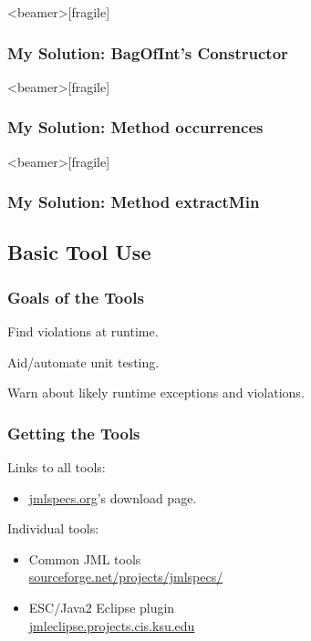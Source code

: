 \begin{frame}<beamer>[fragile]
\frametitle{My Solution: BagOfInt's Constructor}


\end{frame}

\begin{frame}<beamer>[fragile]
\frametitle{My Solution: Method occurrences}


\end{frame}

\begin{frame}<beamer>[fragile]
\frametitle{My Solution: Method extractMin}


\end{frame}


\subsection[Tools]{Basic Tool Use}  %

\begin{frame}
\frametitle{Goals of the Tools}
\begin{description}
\item[jmlc:]
Find violations at runtime.

\item[jmlunit:]
Aid/automate unit testing.

\item[ESC/Java2:]
Warn about likely runtime exceptions and violations.
\end{description}
\end{frame}

\begin{frame}
\frametitle{Getting the Tools}

Links to all tools:
\begin{itemize}
\item
\href{http://www.jmlspecs.org/}{jmlspecs.org}'s download page.
\end{itemize}


Individual tools:
\begin{itemize}
\item
Common JML tools \\
\href{http://sourceforge.net/projects/jmlspecs/}{sourceforge.net/projects/jmlspecs/}

\item
ESC/Java2 Eclipse plugin \\
\href{http://jmleclipse.projects.cis.ksu.edu}{jmleclipse.projects.cis.ksu.edu}
\end{itemize}
\end{frame}

